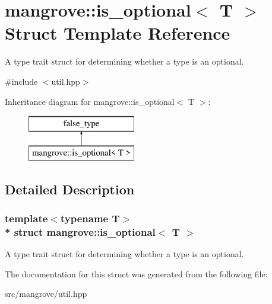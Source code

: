 \hypertarget{structmangrove_1_1is__optional}{}\section{mangrove\+:\+:is\+\_\+optional$<$ T $>$ Struct Template Reference}
\label{structmangrove_1_1is__optional}


A type trait struct for determining whether a type is an optional.  




{\ttfamily \#include $<$util.\+hpp$>$}

Inheritance diagram for mangrove\+:\+:is\+\_\+optional$<$ T $>$\+:\begin{figure}[H]
\begin{center}
\leavevmode
\includegraphics[height=2.000000cm]{structmangrove_1_1is__optional}
\end{center}
\end{figure}


\subsection{Detailed Description}
\subsubsection*{template$<$typename T$>$\\*
struct mangrove\+::is\+\_\+optional$<$ T $>$}

A type trait struct for determining whether a type is an optional. 

The documentation for this struct was generated from the following file\+:\begin{DoxyCompactItemize}
\item 
src/mangrove/util.\+hpp\end{DoxyCompactItemize}
